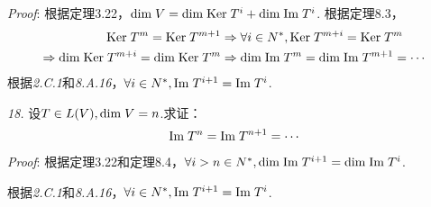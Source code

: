 \textit{Proof}:
根据定理3.22，\(\mathrm{dim \;} V=\mathrm{dim \;} \mathrm{Ker \;} T^i+\mathrm{dim \;} \mathrm{Im \;} T^i\).
根据定理8.3，
    \begin{align*}
        \mathrm{Ker \;} T^m=\mathrm{Ker \;} T^{m+1} &\Rightarrow \forall i \in N^*,\mathrm{Ker \;} T^{m+i}=\mathrm{Ker \;} T^m \\
        \Rightarrow \mathrm{dim \;} \mathrm{Ker \;} T^{m+i}=\mathrm{dim \;} \mathrm{Ker \;} T^m
        &\Rightarrow \mathrm{dim \;} \mathrm{Im \;} T^m=\mathrm{dim \;} \mathrm{Im \;} T^{m+1}=\cdots
    \end{align*}
根据\textit{2.C.1}和\textit{8.A.16}，\(\forall i \in N^*,\mathrm{Im \;} T^{i+1}=\mathrm{Im \;} T^i\).

\hspace*{\fill}

\textit{18.}
设\(T \in L(V),\mathrm{dim \;} V=n\).求证：
    \begin{align*}
        \mathrm{Im \;} T^n=\mathrm{Im \;} T^{n+1}=\cdots
    \end{align*}
\textit{Proof}:
根据定理3.22和定理8.4，\(\forall i>n \in N^*,\mathrm{dim \;} \mathrm{Im \;} T^{i+1}=\mathrm{dim \;} \mathrm{Im \;} T^i\).

根据\textit{2.C.1}和\textit{8.A.16}，\(\forall i \in N^*,\mathrm{Im \;} T^{i+1}=\mathrm{Im \;} T^i\).


